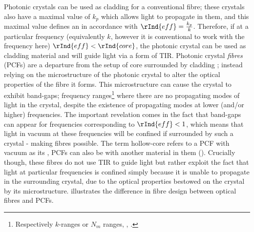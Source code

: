 Photonic crystals can be used as cladding for a conventional fibre; these crystals also have a maximal value of $k_{p}$ which allows light to propagate in them, and this maximal value defines an  in accordance with $\rInd{eff} = \frac{k_{p}}{k}$.
Therefore, if at a particular frequency (equivalently $k$, however it is conventional to work with the frequency here) $\rInd{eff}<\rInd{core}$, the photonic crystal can be used as cladding material and will guide light via a form of TIR. 
Photonic crystal \textit{fibres} (PCFs) are a departure from the setup of core surrounded by cladding \cite{russell2003photonic}; instead relying on the microstructure of the photonic crystal to alter the optical properties of the fibre it forms.
This microstructure can cause the crystal to exhibit band-gaps; frequency ranges\footnote{Respectively $k$-ranges or $N_{m}$ ranges, \cite{knight2003photonic}, \cite{russell2003photonic}.} where there are no propagating modes of light in the crystal, despite the existence of propagating modes at lower (and/or higher) frequencies.
The important revelation comes in the fact that band-gaps can appear for frequencies corresponding to $\rInd{eff}<1$, which means that light in vacuum at these frequencies will be confined if surrounded by such a crystal - making  fibres possible.
The term hollow-core refers to a PCF with vacuum as its , PCFs can also be  with another material in them ().
Crucially though, these fibres do not use TIR to guide light but rather exploit the fact that light at particular frequencies is confined simply because it is unable to propagate in the surrounding crystal, due to the optical properties bestowed on the crystal by its microstructure.
 illustrates the difference in fibre design between optical fibres and PCFs. \newline

